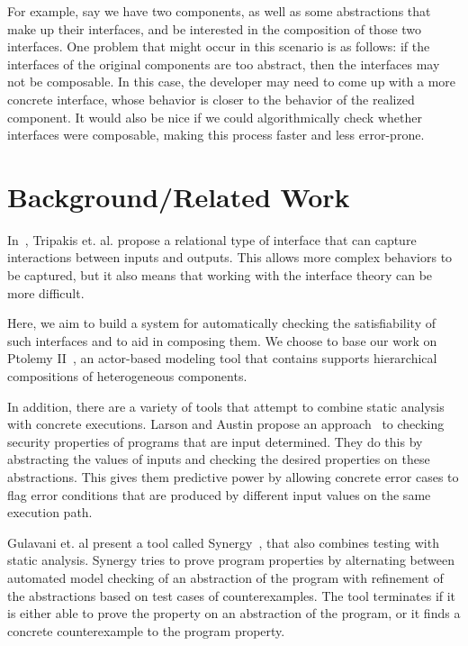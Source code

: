 \documentclass[preprint,11pt]{sigplanconf}
\begin{document}
For example, say we have two components, as well as some abstractions that
make up their interfaces, and be interested in the composition of those two
interfaces. One problem that might occur in this scenario is as follows: if the
interfaces of the original components are too abstract, then the interfaces
may not be composable. In this case, the developer may need to come up with a
more concrete interface, whose behavior is closer to the behavior of the
realized component. It would also be nice if we could algorithmically check
whether interfaces were composable, making this process faster and less
error-prone.

\section{Background/Related Work}
In~\cite{relationalInterfaces}, Tripakis et. al. propose a relational type of
interface that can capture interactions between inputs and outputs.
This allows more complex behaviors to be captured, but it also means that
working with the interface theory can be more difficult.

Here, we aim to build a system for automatically checking the satisfiability
of such interfaces and to aid in composing them.
We choose to base our work on Ptolemy II~\cite{ptII}, an actor-based modeling
tool that contains supports hierarchical compositions of heterogeneous components.

In addition, there are a variety of tools that attempt to combine static analysis
with concrete executions.
%
Larson and Austin propose an approach~\cite{larsonAustin:2003:coverageDetection} 
to checking security properties of programs that are input determined.  They do
this by abstracting the values of inputs and checking the desired properties on
these abstractions. This gives them predictive power by allowing concrete error
cases to flag error conditions that are produced by different input values on the
same execution path.

Gulavani et. al present a tool called Synergy~\cite{gulavani:synergy}, that
also combines testing with static analysis.  Synergy tries to prove program
properties by alternating between automated model checking of an abstraction of
the program with refinement of the abstractions based on test cases of
counterexamples.  The tool terminates if it is either able to prove the property
on an abstraction of the program, or it finds a concrete counterexample to the
program property.

\end{document}
